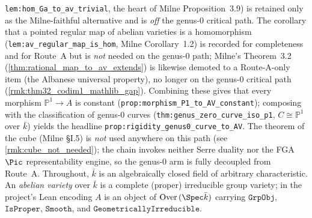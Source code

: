 \texttt{lem:hom_Ga_to_av_trivial}, the heart of Milne Proposition~3.9) is retained only as the
Milne-faithful alternative and is \emph{off} the genus-\(0\) critical path. The corollary that a
pointed regular map of abelian
varieties is a homomorphism (\texttt{lem:av_regular_map_is_hom}, Milne Corollary~1.2) is recorded
for completeness and for Route~A but is \emph{not} needed on the genus-\(0\) path; Milne's
Theorem~3.2 (\cref{thm:rational_map_to_av_extends}) is likewise demoted to a Route-A-only item
(the Albanese universal property), no longer on the genus-\(0\) critical path
(\cref{rmk:thm32_codim1_mathlib_gap}). Combining these
gives that every morphism \(\mathbb P^1 \to A\) is constant
(\texttt{prop:morphism_P1_to_AV_constant}); composing with the classification of genus-\(0\)
curves (\texttt{thm:genus_zero_curve_iso_p1}, \(C \cong \mathbb P^1\) over \(\bar k\)) yields the
headline \texttt{prop:rigidity_genus0_curve_to_AV}. The theorem of the cube (Milne \S I.5) is
\emph{not} used anywhere on this path (see \cref{rmk:cube_not_needed}); the chain invokes
neither Serre duality nor the FGA \(\Pic\) representability engine, so the genus-\(0\) arm is
fully decoupled from Route~A.
\medskip
Throughout, \(\bar k\) is an algebraically closed field of arbitrary characteristic. An
\emph{abelian variety} over \(\bar k\) is a complete (proper) irreducible group variety; in the
project's Lean encoding \(A\) is an object of \(\mathrm{Over}\,(\Spec \bar k)\) carrying
\(\mathtt{GrpObj}\), \(\mathtt{IsProper}\), \(\mathtt{Smooth}\), and \(\mathtt{GeometricallyIrreducible}\).

